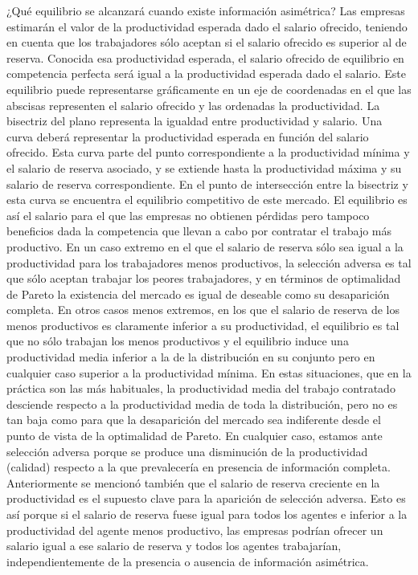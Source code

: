 \documentclass{nuevotema}
\begin{document}
¿Qué equilibrio se alcanzará cuando existe información asimétrica? Las empresas estimarán el valor de la productividad esperada dado el salario ofrecido, teniendo en cuenta que los trabajadores sólo aceptan si el salario ofrecido es superior al de reserva. Conocida esa productividad esperada, el salario ofrecido de equilibrio en competencia perfecta será igual a la productividad esperada dado el salario. Este equilibrio puede representarse gráficamente en un eje de coordenadas en el que las abscisas representen el salario ofrecido y las ordenadas la productividad. La bisectriz del plano representa la igualdad entre productividad y salario. Una curva deberá representar la productividad esperada en función del salario ofrecido. Esta curva parte del punto correspondiente a la productividad mínima y el salario de reserva asociado, y se extiende hasta la productividad máxima y su salario de reserva correspondiente. En el punto de intersección entre la bisectriz y esta curva se encuentra el equilibrio competitivo de este mercado. El equilibrio es así el salario para el que las empresas no obtienen pérdidas pero tampoco beneficios dada la competencia que llevan a cabo por contratar el trabajo más productivo. En un caso extremo en el que el salario de reserva sólo sea igual a la productividad para los trabajadores menos productivos, la selección adversa es tal que sólo aceptan trabajar los peores trabajadores, y en términos de optimalidad de Pareto la existencia del mercado es igual de deseable como su desaparición completa. En otros casos menos extremos, en los que el salario de reserva de los menos productivos es claramente inferior a su productividad, el equilibrio es tal que no sólo trabajan los menos productivos y el equilibrio induce una productividad media inferior a la de la distribución en su conjunto pero en cualquier caso superior a la productividad mínima. En estas situaciones, que en la práctica son las más habituales, la productividad media del trabajo contratado desciende respecto a la productividad media de toda la distribución, pero no es tan baja como para que la desaparición del mercado sea indiferente desde el punto de vista de la optimalidad de Pareto. En cualquier caso, estamos ante selección adversa porque se produce una disminución de la productividad (calidad) respecto a la que prevalecería en presencia de información completa. Anteriormente se mencionó también que el salario de reserva creciente en la productividad es el supuesto clave para la aparición de selección adversa. Esto es así porque si el salario de reserva fuese igual para todos los agentes e inferior a la productividad del agente menos productivo, las empresas podrían ofrecer un salario igual a ese salario de reserva y todos los agentes trabajarían, independientemente de la presencia o ausencia de información asimétrica.
\end{document}
